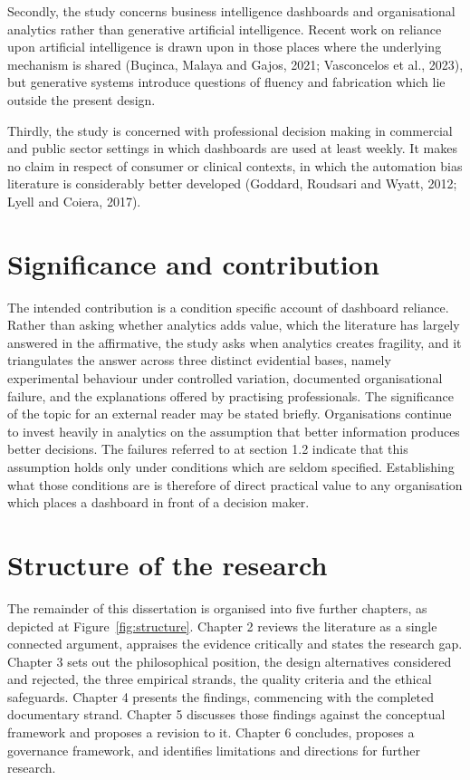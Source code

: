\documentclass[12pt,a4paper]{article}
\begin{document}
Secondly, the study concerns business intelligence dashboards and organisational analytics rather than
generative artificial intelligence. Recent work on reliance upon artificial intelligence is drawn upon in
those places where the underlying mechanism is shared (Buçinca, Malaya and Gajos, 2021; Vasconcelos et al.,
2023), but generative systems introduce questions of fluency and fabrication which lie outside the present
design.

Thirdly, the study is concerned with professional decision making in commercial and public sector settings
in which dashboards are used at least weekly. It makes no claim in respect of consumer or clinical
contexts, in which the automation bias literature is considerably better developed (Goddard, Roudsari and
Wyatt, 2012; Lyell and Coiera, 2017).

\section{Significance and contribution}

The intended contribution is a condition specific account of dashboard reliance. Rather than
asking whether analytics adds value, which the literature has largely answered in the affirmative,
the study asks when analytics creates fragility, and it triangulates the answer across three
distinct evidential bases, namely experimental behaviour under controlled variation, documented
organisational failure, and the explanations offered by practising professionals. The significance
of the topic for an external reader may be stated briefly. Organisations continue to invest
heavily in analytics on the assumption that better information produces better decisions. The
failures referred to at section 1.2 indicate that this assumption holds only under conditions
which are seldom specified. Establishing what those conditions are is therefore of direct
practical value to any organisation which places a dashboard in front of a decision maker.

\section{Structure of the research}

The remainder of this dissertation is organised into five further chapters, as depicted at
Figure~\ref{fig:structure}. Chapter 2 reviews the literature as a single connected argument,
appraises the evidence critically and states the research gap. Chapter 3 sets out the
philosophical position, the design alternatives considered and rejected, the three empirical
strands, the quality criteria and the ethical safeguards. Chapter 4 presents the findings,
commencing with the completed documentary strand. Chapter 5 discusses those findings against the
conceptual framework and proposes a revision to it. Chapter 6 concludes, proposes a governance
framework, and identifies limitations and directions for further research.
\end{document}
